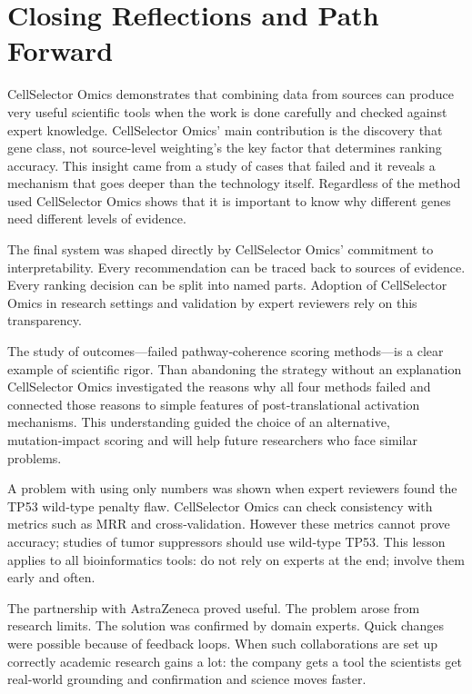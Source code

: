 \documentclass[author={Karen Coutinho, Ishaan Bhalla, Aman Raj, Dixit Kaloorani Malarmannan},
                supervisor={Dr. Daniel D'Andrea},
                degree={MSc},
                title={CellSelector Omics: A Multi-Omics Recommendation System for Cell Line Selection},
                subtitle={},
                type={},
                year={2026}]{dissertation}
\begin{document}
\section{Closing Reflections and Path Forward}

CellSelector Omics demonstrates that combining data from sources can produce very useful scientific tools when the work is done carefully and checked against expert knowledge. CellSelector Omics’ main contribution is the discovery that gene class, not source-level weighting's the key factor that determines ranking accuracy. This insight came from a study of cases that failed and it reveals a mechanism that goes deeper than the technology itself. Regardless of the method used CellSelector Omics shows that it is important to know why different genes need different levels of evidence.

The final system was shaped directly by CellSelector Omics’ commitment to interpretability. Every recommendation can be traced back to sources of evidence. Every ranking decision can be split into named parts. Adoption of CellSelector Omics in research settings and validation by expert reviewers rely on this transparency.

The study of outcomes—failed pathway‑coherence scoring methods—is a clear example of scientific rigor. Than abandoning the strategy without an explanation CellSelector Omics investigated the reasons why all four methods failed and connected those reasons to simple features of post‑translational activation mechanisms. This understanding guided the choice of an alternative, mutation‑impact scoring and will help future researchers who face similar problems.

A problem with using only numbers was shown when expert reviewers found the TP53 wild‑type penalty flaw. CellSelector Omics can check consistency with metrics such as MRR and cross‑validation. However these metrics cannot prove accuracy; studies of tumor suppressors should use wild‑type TP53. This lesson applies to all bioinformatics tools: do not rely on experts at the end; involve them early and often.

The partnership with AstraZeneca proved useful. The problem arose from research limits. The solution was confirmed by domain experts. Quick changes were possible because of feedback loops. When such collaborations are set up correctly academic research gains a lot: the company gets a tool the scientists get real‑world grounding and confirmation and science moves faster.
\end{document}
